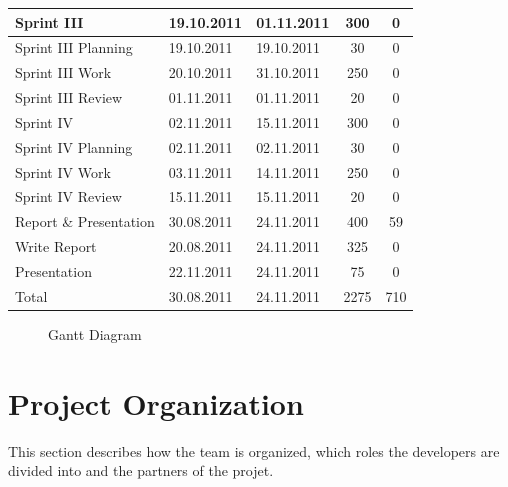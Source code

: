 \begin{table}[!htb]
\begin{tabular}{l l l c c}
	\midrule
	Sprint III & 19.10.2011 & 01.11.2011 & 300 & 0 \\
	\midrule
	Sprint III Planning & 19.10.2011 & 19.10.2011 & 30 & 0 \\
	Sprint III Work & 20.10.2011 & 31.10.2011 & 250 & 0 \\
	Sprint III Review & 01.11.2011 & 01.11.2011 & 20 & 0 \\
	\midrule
	Sprint IV & 02.11.2011 & 15.11.2011 & 300 & 0 \\
	\midrule
	Sprint IV Planning & 02.11.2011 & 02.11.2011 & 30 & 0 \\
	Sprint IV Work & 03.11.2011 & 14.11.2011 & 250 & 0 \\
	Sprint IV Review & 15.11.2011 & 15.11.2011 & 20 & 0 \\
	\midrule
	Report \& Presentation & 30.08.2011 & 24.11.2011 & 400 & 59 \\
	\midrule
	Write Report & 20.08.2011 & 24.11.2011 & 325 & 0 \\
	Presentation & 22.11.2011 & 24.11.2011 & 75 & 0 \\
	\midrule
	Total & 30.08.2011 & 24.11.2011 & 2275 & 710 \\
	\bottomrule
\end{tabular}
\end{table}

\begin{figure}[!htb]
	\noindent{}
	\caption{Gantt Diagram\label{fig:gantt}}
\end{figure}


\section{Project Organization}
\label{sec:plan:org}
This section describes how the team is organized, which roles the developers are divided into and the partners of the projet.

